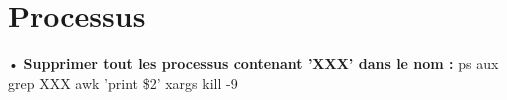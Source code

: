 \section*{Processus}

\begin{list}

\item{•} \textbf{Supprimer tout les processus contenant 'XXX' dans le nom :} 
ps aux \mid grep XXX \mid awk  '{print \$2}' \mid xargs  kill -9

\end{list}